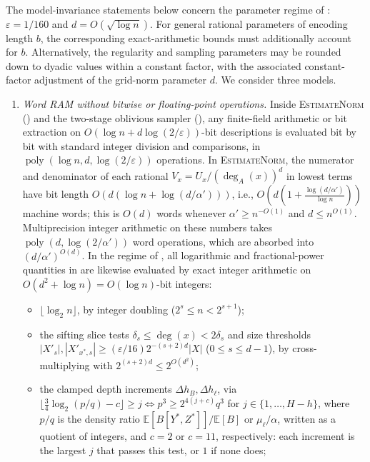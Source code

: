 \documentclass[11pt]{article}
\theoremstyle{definition}
\newcommand{\E}{\mathbb{E}}
\newcommand{\poly}{\operatorname{poly}}
\newcommand{\abs}[1]{\left\lvert #1 \right\rvert}
\newcommand{\dens}[1]{\E[#1]}
\newcommand{\EstimateNorm}{\textnormal{\textsc{EstimateNorm}}}
\begin{document}
The model-invariance statements below concern the parameter regime of : $\varepsilon = 1/160$ and $d = O(\sqrt{\log n})$. For general rational parameters of encoding length $b$, the corresponding exact-arithmetic bounds must additionally account for $b$. Alternatively, the regularity and sampling parameters may be rounded down to dyadic values within a constant factor, with the associated constant-factor adjustment of the grid-norm parameter $d$. We consider three models.
\begin{enumerate}[leftmargin=*]
    \item \emph{Word RAM without bitwise or floating-point operations.} Inside \EstimateNorm{} () and the two-stage oblivious sampler (), any finite-field arithmetic or bit extraction on $O(\log n + d\log(2/\varepsilon))$-bit descriptions is evaluated bit by bit with standard integer division and comparisons, in $\poly(\log n, d, \log(2/\varepsilon))$ operations. In \EstimateNorm{}, the numerator and denominator of each rational $V_x = U_x / (\deg_A(x))^d$ in lowest terms have bit length $O(d(\log n + \log(d/\alpha')))$, i.e., $O(d(1 + \frac{\log(d/\alpha')}{\log n}))$ machine words; this is $O(d)$ words whenever $\alpha' \ge n^{-O(1)}$ and $d \le n^{O(1)}$. Multiprecision integer arithmetic on these numbers takes $\poly(d, \log(2/\alpha'))$ word operations, which are absorbed into $(d/\alpha')^{O(d)}$. In the regime of , all logarithmic and fractional-power quantities in  are likewise evaluated by exact integer arithmetic on $O(d^2 + \log n) = O(\log n)$-bit integers:
    \begin{itemize}[leftmargin=*]
        \item $\lfloor \log_2 n \rfloor$, by integer doubling ($2^s \le n < 2^{s+1}$);
        \item the sifting slice tests $\delta_s \le \deg(x) < 2\delta_s$ and size thresholds $\abs{X'_s}, \abs{X'_{x^*, s}} \ge (\varepsilon/16)2^{-(s+2)d}\abs{X}$ ($0 \le s \le d-1$), by cross-multiplying with $2^{(s+2)d} \le 2^{O(d^2)}$;
        \item the clamped depth increments $\Delta h_B, \Delta h_\ell$, via $\lfloor \frac{3}{4}\log_2(p/q) - c \rfloor \ge j \iff p^3 \ge 2^{4(j+c)} q^3$ for $j \in \{1, \dots, H-h\}$, where $p/q$ is the density ratio $\dens{B[Y^*, Z^*]}/\dens{B}$ or $\mu_\ell/\alpha$, written as a quotient of integers, and $c = 2$ or $c = 11$, respectively: each increment is the largest $j$ that passes this test, or $1$ if none does;

\end{itemize}
\end{enumerate}
\end{document}

